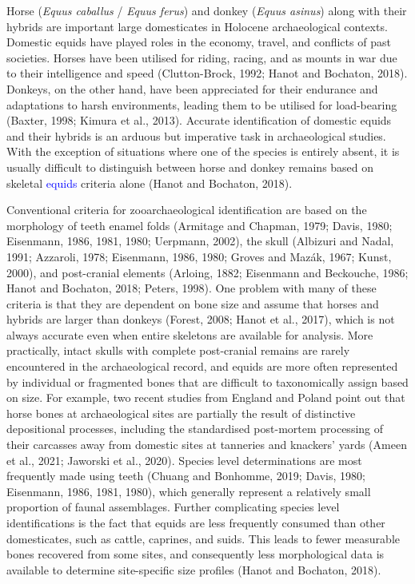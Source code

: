 \documentclass[preprint, 3p, authoryear]{elsarticle} %
\begin{document}
Horse (\emph{Equus caballus} / \emph{Equus ferus}) and donkey (\emph{Equus asinus}) along with their hybrids are important large domesticates in Holocene archaeological contexts. Domestic equids have played roles in the economy, travel, and conflicts of past societies. Horses have been utilised for riding, racing, and as mounts in war due to their intelligence and speed (Clutton-Brock, 1992; Hanot and Bochaton, 2018). Donkeys, on the other hand, have been appreciated for their endurance and adaptations to harsh environments, leading them to be utilised for load-bearing (Baxter, 1998; Kimura et al., 2013). Accurate identification of domestic equids and their hybrids is an arduous but imperative task in archaeological studies. With the exception of situations where one of the species is entirely absent, it is usually difficult to distinguish between horse and donkey remains based on skeletal \textcolor{blue}{\textcolor{blue}{equids}} criteria alone (Hanot and Bochaton, 2018).

Conventional criteria for zooarchaeological identification are based on the morphology of teeth enamel folds (Armitage and Chapman, 1979; Davis, 1980; Eisenmann, 1986, 1981, 1980; Uerpmann, 2002), the skull (Albizuri and Nadal, 1991; Azzaroli, 1978; Eisenmann, 1986, 1980; Groves and Mazák, 1967; Kunst, 2000), and post-cranial elements (Arloing, 1882; Eisenmann and Beckouche, 1986; Hanot and Bochaton, 2018; Peters, 1998). One problem with many of these criteria is that they are dependent on bone size and assume that horses and hybrids are larger than donkeys (Forest, 2008; Hanot et al., 2017), which is not always accurate even when entire skeletons are available for analysis. More practically, intact skulls with complete post-cranial remains are rarely encountered in the archaeological record, and equids are more often represented by individual or fragmented bones that are difficult to taxonomically assign based on size. For example, two recent studies from England and Poland point out that horse bones at archaeological sites are partially the result of distinctive depositional processes, including the standardised post-mortem processing of their carcasses away from domestic sites at tanneries and knackers' yards (Ameen et al., 2021; Jaworski et al., 2020). Species level determinations are most frequently made using teeth (Chuang and Bonhomme, 2019; Davis, 1980; Eisenmann, 1986, 1981, 1980), which generally represent a relatively small proportion of faunal assemblages. Further complicating species level identifications is the fact that equids are less frequently consumed than other domesticates, such as cattle, caprines, and suids. This leads to fewer measurable bones recovered from some sites, and consequently less morphological data is available to determine site-specific size profiles (Hanot and Bochaton, 2018).
\end{document}
